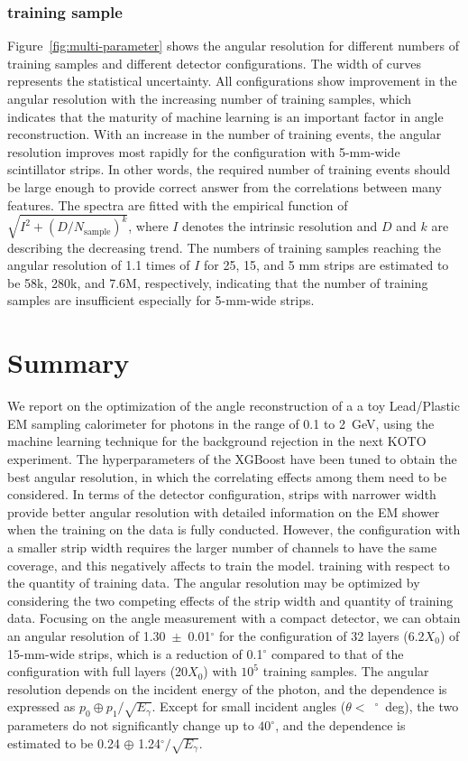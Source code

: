 \documentclass[12pt,times,draftclsnofoot,a4paper]{elsarticle}
\begin{document}
\subsubsection{training sample}
Figure~\ref{fig:multi-parameter} shows the angular resolution for different numbers of training samples and different detector configurations. The width of curves represents the statistical uncertainty. All configurations show improvement in the angular resolution with the increasing number of training samples, which indicates that the maturity of machine learning is an important factor in angle reconstruction. With an increase in the number of training events, the angular resolution improves most rapidly for the configuration with 5-mm-wide scintillator strips. In other words, the required number of training events should be large enough to provide correct answer from the correlations 
between many features. The spectra are fitted with the empirical function of $\sqrt{I^{2} + (D/N_{\mathrm{sample}})^{k}}$, where $I$ denotes the intrinsic resolution and $D$ and $k$ are describing the decreasing trend. The numbers of training samples reaching the angular resolution of 1.1 times of $I$ for 25, 15, and 5 mm strips are estimated to be 58k, 280k, and 7.6M, respectively, indicating that the number of training samples are insufficient especially for 5-mm-wide strips.
 
\section{Summary}
\label{sec:sum}

We report on the optimization of the angle reconstruction of a a toy Lead/Plastic EM sampling calorimeter for photons in the range of 0.1 to 2~GeV, using the machine learning technique for the background rejection in the next KOTO experiment. The hyperparameters of the XGBoost have been tuned to obtain the best angular resolution, in which the correlating effects among them need to be considered. In terms of the detector configuration, strips with narrower width provide better angular resolution with detailed information on the EM shower when the training on the data is fully conducted. However, the configuration with a smaller strip width requires the larger number of channels to have the same coverage, and this negatively affects to train the model. training with respect to the quantity of training data. The angular resolution may be optimized by considering the two competing effects of the strip width and quantity of training data. Focusing on the angle measurement with a compact detector, we can obtain an angular resolution of 1.30~$\pm$~0.01$^{\circ}$ for the configuration of 32 layers (6.2$X_{0}$) of 15-mm-wide strips, which is a reduction of 0.1$^{\circ}$ compared to that of the configuration with full layers (20$X_{0}$) with $10^{5}$ training samples. The angular resolution depends on the incident energy of the photon, and the dependence is expressed as $p_{0} \oplus p_{1}/\sqrt{E_{\gamma}}$. Except for small incident angles ($\theta<$~$^{\circ}$~deg), the two parameters do not significantly change up to $40^{\circ}$, and the dependence is estimated to be 0.24 $\oplus$ 1.24$^{\circ}/\sqrt{E_{\gamma}}$.
\end{document}
